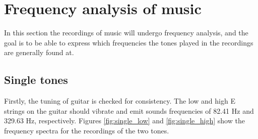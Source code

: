\section{Frequency analysis of music}
In this section the recordings of music will undergo frequency analysis, and the goal is to be able to express which frequencies the tones played in the recordings are generally found at.
\subsection{Single tones}\label{sec:single}
Firstly, the tuning of guitar is checked for consistency. The low and high E strings on the guitar should vibrate and emit sounds frequencies of 82.41 Hz and 329.63 Hz, respectively. Figures \ref{fig:single_low} and \ref{fig:single_high} show the frequency spectra for the recordings of the two tones.
